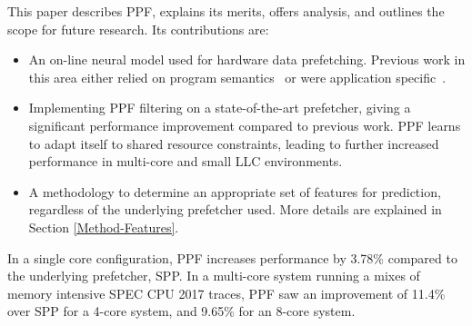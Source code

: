 
This paper describes PPF, explains its merits, offers analysis, and
outlines the scope for future research. Its contributions are:

\begin{itemize}

\item An on-line neural model used for hardware data prefetching. Previous
work in this area either relied on program semantics~\cite{Semantics} or were
application specific~\cite{Datacenter}.

\item Implementing PPF filtering on a state-of-the-art prefetcher, giving a
significant performance improvement compared to previous work. PPF learns to
adapt itself to shared resource constraints, leading to further increased
performance in multi-core and small LLC environments.

\item A methodology to determine an appropriate set of features for
prediction, regardless of the underlying prefetcher used. More details are
explained in Section \ref{Method-Features}.

\end{itemize}

In a single core configuration, PPF increases performance by 3.78\%
compared to the underlying prefetcher, SPP. In a multi-core system running a
mixes of memory intensive SPEC CPU 2017 traces, PPF saw an improvement
of 11.4\% over SPP for a 4-core system, and 9.65\% for an 8-core system.

